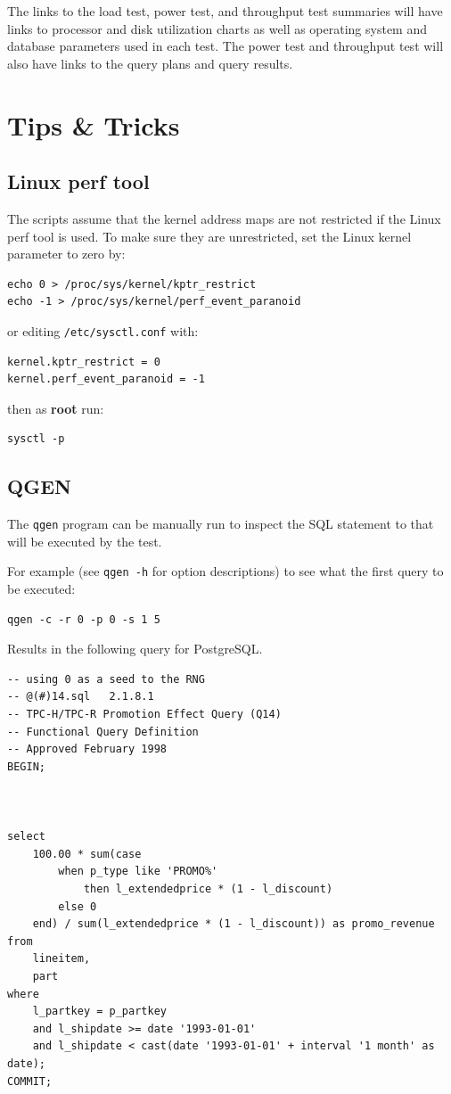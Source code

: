 \documentclass{article}
\begin{document}
The links to the load test, power test, and throughput test summaries will have links to processor and disk utilization charts as well as operating system and database parameters used in each test.  The power test and throughput test will also have links to the query plans and query results.

\section{Tips \& Tricks}

\subsection{Linux perf tool}

The scripts assume that the kernel address maps are not restricted if the Linux
perf tool is used.  To make sure they are unrestricted, set the Linux kernel
parameter to zero by:

\lstset{language=sh}
\begin{lstlisting}
echo 0 > /proc/sys/kernel/kptr_restrict
echo -1 > /proc/sys/kernel/perf_event_paranoid
\end{lstlisting}

or editing \texttt{/etc/sysctl.conf} with:
\lstset{language=sh}
\begin{lstlisting}
kernel.kptr_restrict = 0
kernel.perf_event_paranoid = -1
\end{lstlisting}

then as \textbf{root} run:
\lstset{language=sh}
\begin{lstlisting}
sysctl -p
\end{lstlisting}

\subsection{QGEN}

The \texttt{qgen} program can be manually run to inspect the SQL statement to that will be executed by the test.

For example (see \texttt{qgen -h} for option descriptions) to see what the first query to be executed:
\lstset{language=sh}
\begin{lstlisting}
qgen -c -r 0 -p 0 -s 1 5
\end{lstlisting}

Results in the following query for PostgreSQL.
\lstset{language=sql}
\begin{lstlisting}
-- using 0 as a seed to the RNG
-- @(#)14.sql	2.1.8.1
-- TPC-H/TPC-R Promotion Effect Query (Q14)
-- Functional Query Definition
-- Approved February 1998
BEGIN;



select
	100.00 * sum(case
		when p_type like 'PROMO%'
			then l_extendedprice * (1 - l_discount)
		else 0
	end) / sum(l_extendedprice * (1 - l_discount)) as promo_revenue
from
	lineitem,
	part
where
	l_partkey = p_partkey
	and l_shipdate >= date '1993-01-01'
	and l_shipdate < cast(date '1993-01-01' + interval '1 month' as date);
COMMIT;
\end{lstlisting}
\end{document}
